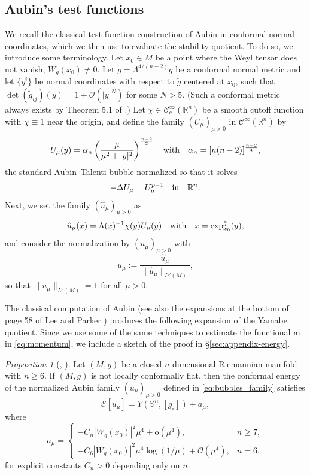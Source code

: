 \documentclass[reqno,11pt]{amsart}
\numberwithin{equation}{section}
\theoremstyle{definition}
\theoremstyle{remark}
\newtheorem{propositionletter}[theoremletter]{Proposition}
\newcommand{\R}{\mathbb{R}}
\newcommand{\Ss}{\mathbb{S}}
\begin{document}
\subsection{Aubin's test functions}
We recall the classical test function construction of Aubin \cite{Aub} in conformal normal coordinates, 
which we then use to evaluate the stability quotient. To do so, we introduce some terminology.
Let $x_0 \in M$ be a point where the Weyl tensor does not vanish, $W_g(x_0) \neq 0$. Let 
$\tilde{g} = \Lambda^{4/(n-2)} g$ be a conformal normal metric and let $\{ y^i\}$ be normal 
coordinates with respect to $\tilde{g}$ centered at $x_0$, such that 
$\det(\tilde{g}_{ij})(y) = 1 + \mathcal{O}(|y|^N)$ for some $N >5$. (Such a conformal metric 
always exists by Theorem 5.1 
of \cite{LP}.) Let $\chi \in \mathcal{C}^\infty_c(\R^n)$ be a smooth cutoff function with 
$\chi \equiv 1$ near the origin, and define the family $(U_\mu)_{\mu > 0}$ in $\mathcal{C}^\infty(\R^n)$ by
\begin{equation}
\label{eq:talenti-aubin}
  U_\mu(y) = \alpha_n \left(\frac{\mu}{\mu^2 + |y|^2}\right)^{\frac{n-2}{2}} \quad {\rm with} 
  \quad \alpha_n = [n(n-2)]^{\frac{n-2}{4}},
\end{equation}
the standard Aubin--Talenti bubble normalized so that it solves
\[
-\Delta U_\mu = U_\mu^{p-1} \quad {\rm in} \quad  \R^n.
\]
Next, we set the family $(\hat{u}_\mu)_{\mu>0}$ as
\[
\hat{u}_\mu(x) = \Lambda(x)^{-1} \chi(y) U_\mu(y) \quad {\rm with} \quad x = \exp_{x_0}^{\tilde{g}}(y),
\]
and consider the normalization by $(u_\mu)_{\mu>0}$ with
\begin{equation}\label{eq:bubbles_family}
u_\mu := \frac{\hat{u}_\mu}{\|\hat{u}_\mu\|_{L^p(M)}},
\end{equation}
so that $\|u_\mu\|_{L^p(M)} = 1$ for all $\mu>0$.

The classical computation of Aubin \cite{Aub} (see also the expansions at the 
bottom of page 58 of Lee and Parker \cite{LP}) produces the following expansion of the Yamabe 
quotient. Since we use some of the same techniques to 
estimate the functional $\mathsf{m}$ in \eqref{eq:momentum}, we include a sketch of the
proof in \S\ref{sec:appendix-energy}. 

\begin{propositionletter}[\cite{Aub}, \cite{LP}]
\label{prop:aubin-energy}
Let $(M, g)$ be a closed $n$-dimensional Riemannian manifold with $n \geqslant 6$. If $(M,g)$ is not locally conformally flat, then the conformal energy of the normalized Aubin family $(u_\mu)_{\mu>0}$ defined in \eqref{eq:bubbles_family} satisfies
\[
\mathcal{E}[u_\mu] = Y(\Ss^n,[g_\circ]) + a_\mu,
\]
where
\[
a_\mu =
\begin{cases}
-C_n |W_g(x_0)|^2 \mu^4 + \mathrm{o}(\mu^4), & n \geqslant 7, \\[4pt]
-C_6 |W_g(x_0)|^2 \mu^4 \log(1/\mu) + \mathcal{O}(\mu^4), & n = 6,
\end{cases}
\]
for explicit constants $C_n > 0$ depending only on $n$.
\end{propositionletter}
\end{document}
